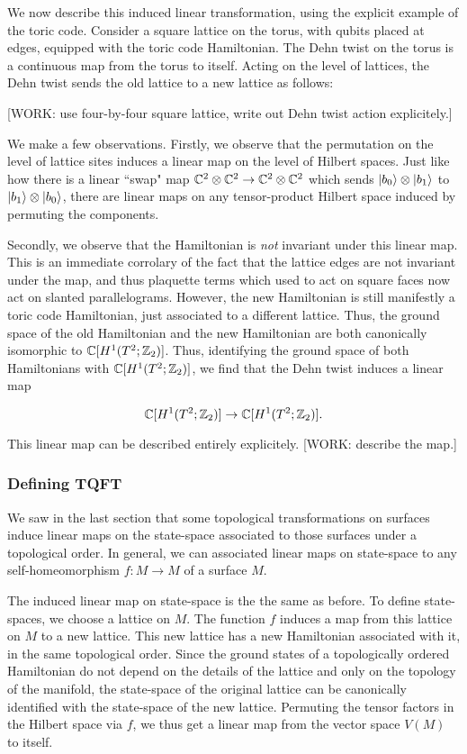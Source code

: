 We now describe this induced linear transformation, using the explicit example of the toric code. Consider a square lattice on the torus, with qubits placed at edges, equipped with the toric code Hamiltonian. The Dehn twist on the torus is a continuous map from the torus to itself. Acting on the level of lattices, the Dehn twist sends the old lattice to a new lattice as follows:

[WORK: use four-by-four square lattice, write out Dehn twist action explicitely.]

We make a few observations. Firstly, we observe that the permutation on the level of lattice sites induces a linear map on the level of Hilbert spaces. Just like how there is a linear ``swap" map $\mathbb{C}^2\otimes \mathbb{C}^2\to \mathbb{C}^2\otimes \mathbb{C}^2$ which sends $\ket{b_0}\otimes \ket{b_1}$ to $\ket{b_1}\otimes \ket{b_0}$, there are linear maps on any tensor-product Hilbert space induced by permuting the components.

Secondly, we observe that the Hamiltonian is \textit{not} invariant under this linear map. This is an immediate corrolary of the fact that the lattice edges are not invariant under the map, and thus plaquette terms which used to act on square faces now act on slanted parallelograms. However, the new Hamiltonian is still manifestly a toric code Hamiltonian, just associated to a different lattice. Thus, the ground space of the old Hamiltonian and the new Hamiltonian are both canonically isomorphic to $\mathbb{C}[H^1(T^2;\mathbb{Z}_2)]$. Thus, identifying the ground space of both Hamiltonians with $\mathbb{C}[H^1(T^2;\mathbb{Z}_2)]$, we find that the Dehn twist induces a linear map

$$\mathbb{C}[H^1(T^2;\mathbb{Z}_2)]\to \mathbb{C}[H^1(T^2;\mathbb{Z}_2)].$$

This linear map can be described entirely explicitely. [WORK: describe the map.]

\subsubsection{Defining TQFT}

We saw in the last section that some topological transformations on surfaces induce linear maps on the state-space associated to those surfaces under a topological order. In general, we can associated linear maps on state-space to any self-homeomorphism $f:M\to M$ of a surface $M$.

The induced linear map on state-space is the the same as before. To define state-spaces, we choose a lattice on $M$. The function $f$ induces a map from this lattice on $M$ to a new lattice. This new lattice has a new Hamiltonian associated with it, in the same topological order. Since the ground states of a topologically ordered Hamiltonian do not depend on the details of the lattice and only on the topology of the manifold, the state-space of the original lattice can be canonically identified with the state-space of the new lattice. Permuting the tensor factors in the Hilbert space via $f$, we thus get a linear map from the vector space $V(M)$ to itself.

